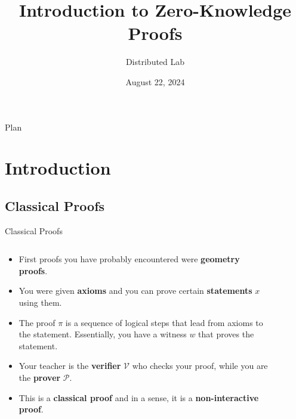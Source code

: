 \documentclass[xcolor={usenames,dvipsnames}]{beamer}
\title[Introduction to ZK]{\textbf{Introduction to Zero-Knowledge Proofs}}
\author{Distributed Lab}
\date{August 22, 2024}
\begin{document}
	\frame {
		\titlepage
	}
 
	\begin{frame}{Plan}
        \tableofcontents
    \end{frame}

	\section{Introduction}

    \subsection{Classical Proofs}
    \begin{frame}{Classical Proofs}
        \begin{columns}
            \begin{column}{0.6\textwidth}
                \begin{itemize}
                    \item First proofs you have probably encountered were \textbf{geometry proofs}. 
                    \item You were given \textbf{axioms} and you can prove certain \textbf{statements} $x$ using them.
                    \item The proof $\pi$ is a sequence of logical steps that lead from axioms to the statement. Essentially, you have a witness $w$ that proves the statement.
                    \item Your teacher is the \textbf{verifier} $\mathcal{V}$ who checks your proof, while you are the \textbf{prover} $\mathcal{P}$.
                    \item This is a \textbf{classical proof} and in a sense, it is a \textbf{non-interactive proof}.
                \end{itemize}
            \end{column}
            \begin{column}{0.4\textwidth}
                \begin{figure}
                \centering

\end{figure}
\end{column}
\end{columns}
\end{frame}
\end{document}
